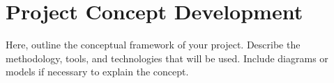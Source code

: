 \section{Project Concept Development}
\label{sec:concept}
Here, outline the conceptual framework of your project. Describe the methodology, tools, and technologies that will be used. Include diagrams or models if necessary to explain the concept.
